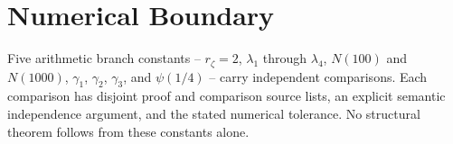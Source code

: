 \section{Numerical Boundary}
\label{v4-arith:w6-h:summary}

Five arithmetic branch constants -- \(r_{\zeta}=2\),
\(\lambda_{1}\) through \(\lambda_{4}\), \(N(100)\) and \(N(1000)\),
\(\gamma_{1}\), \(\gamma_{2}\), \(\gamma_{3}\), and \(\psi(1/4)\) --
carry independent comparisons. Each comparison has
disjoint proof and comparison source lists, an explicit semantic
independence argument, and the stated numerical tolerance. No
structural theorem follows from these constants alone.
